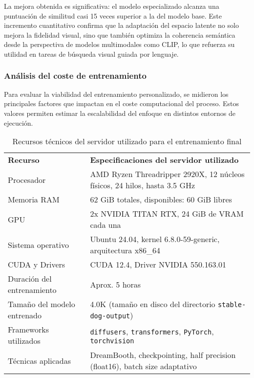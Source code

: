 La mejora obtenida es significativa: el modelo especializado alcanza una puntuación de similitud casi 15 veces superior a la del modelo base. Este incremento cuantitativo confirma que la adaptación del espacio latente no solo mejora la fidelidad visual, sino que también optimiza la coherencia semántica desde la perspectiva de modelos multimodales como CLIP, lo que refuerza su utilidad en tareas de búsqueda visual guiada por lenguaje.

\subsubsection{Análisis del coste de entrenamiento}

Para evaluar la viabilidad del entrenamiento personalizado, se midieron los principales factores que impactan en el coste computacional del proceso. Estos valores permiten estimar la escalabilidad del enfoque en distintos entornos de ejecución.

\begin{table}[H]
\centering
\renewcommand{\arraystretch}{1.5}
\begin{tabular}{p{5cm}p{9cm}}
\rowcolor{gray!30}
\textbf{Recurso} & \textbf{Especificaciones del servidor utilizado} \\
\rowcolor{gray!10}
Procesador & AMD Ryzen Threadripper 2920X, 12 núcleos físicos, 24 hilos, hasta 3.5 GHz \\
Memoria RAM & 62 GiB totales, disponibles: 60 GiB libres \\
\rowcolor{gray!10}
GPU & 2x NVIDIA TITAN RTX, 24 GiB de VRAM cada una \\
Sistema operativo & Ubuntu 24.04, kernel 6.8.0-59-generic, arquitectura x86\_64 \\
\rowcolor{gray!10}
CUDA y Drivers & CUDA 12.4, Driver NVIDIA 550.163.01 \\
Duración del entrenamiento & Aprox. 5 horas \\
\rowcolor{gray!10}
Tamaño del modelo entrenado & 4.0K (tamaño en disco del directorio \texttt{stable-dog-output}) \\
Frameworks utilizados & \texttt{diffusers}, \texttt{transformers}, \texttt{PyTorch}, \texttt{torchvision} \\
\rowcolor{gray!10}
Técnicas aplicadas & DreamBooth, checkpointing, half precision (float16), batch size adaptativo \\
\end{tabular}
\caption{Recursos técnicos del servidor utilizado para el entrenamiento final}
\label{tab:servidor-entrenamiento}
\end{table}

